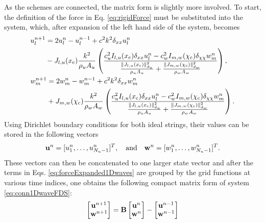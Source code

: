 As the schemes are connected, the matrix form is slightly more involved.
To start, the definition of the force in Eq. \eqref{eq:rigidForce} must be substituted into the system, which, after expansion of the left hand side of the system, becomes
\begin{subequations}\label{eq:forceExpanded1Dwaves}
    \begin{align}
        &\begin{aligned}
            u_l^{n+1} &= 2u_l^n - u_l^{n-1} + c^2k^2\delta_{xx} u_l^n \\
            &- J_{l, u}(x_{\text{c}})\frac{k^2}{\rho_u A_u} \left(\frac{c_u^2 I_{l, u}(x_{\text{c}})\delta_{xx} u_l^n - c_w^2 I_{m, w}(\chi_{\text{c}})\delta_{\chi\chi} w_m^n}{\frac{\lVert J_{l, u}(x_{\text{c}})\rVert_{d_u}^2}{\rho_u A_u} + \frac{\lVert J_{m, w}(\chi_{\text{c}})\rVert_{d_w}^2}{\rho_w A_w}}\right), 
        \end{aligned}\\
        &\begin{aligned}
            w_m^{n+1} &= 2w_m^n - w_m^{n-1} + c^2k^2\delta_{xx} w_m^n \\
            &+ J_{m, w}(\chi_{\text{c}})\frac{k^2}{\rho_w A_w} \left(\frac{c_u^2 I_{l, u}(x_{\text{c}})\delta_{xx} u_l^n - c_w^2 I_{m, w}(\chi_{\text{c}})\delta_{\chi\chi} w_m^n}{\frac{\lVert J_{l, u}(x_{\text{c}})\rVert_{d_u}^2}{\rho_u A_u} + \frac{\lVert J_{m, w}(\chi_{\text{c}})\rVert_{d_w}^2}{\rho_w A_w}}\right).
        \end{aligned}
    \end{align}
\end{subequations}
Using Dirichlet boundary conditions for both ideal strings, their values can be stored in the following vectors
\begin{equation*}
    \mathbf{u}^n =[u_1^n, \hdots, u_{N_u-1}^n]^T, \quad \text{and} \quad \mathbf{w}^n =[w_1^n, \hdots, w_{N_u-1}^n]^T.
\end{equation*}
These vectors can then be concatenated to one larger state vector and after the terms in Eqs. \eqref{eq:forceExpanded1Dwaves} are grouped by the grid functions at various time indices, one obtains the following compact matrix form of system \eqref{eq:conn1DwaveFDS}:
\begin{equation}\label{eq:conn1DwaveMatrix} 
    \begin{bmatrix}
        \mathbf{u}^{n+1}\\
        \mathbf{w}^{n+1}
    \end{bmatrix} = \mathbf{B} \begin{bmatrix}
        \mathbf{u}^n\\
        \mathbf{w}^n
    \end{bmatrix} - \begin{bmatrix}
        \mathbf{u}^{n-1}\\
        \mathbf{w}^{n-1}
    \end{bmatrix}
\end{equation}
